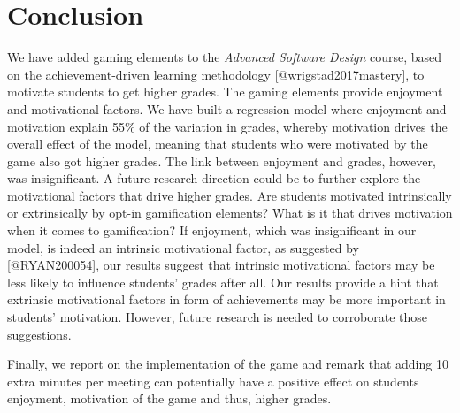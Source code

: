 \documentclass[
]{article}
\begin{document}
\hypertarget{conclusion}{%
\section{Conclusion}\label{conclusion}}

We have added gaming elements to the \textit{Advanced Software Design}
course, based on the achievement-driven learning methodology
{[}@wrigstad2017mastery{]}, to motivate students to get higher grades.
The gaming elements provide enjoyment and motivational factors. We have
built a regression model where enjoyment and motivation explain 55\% of
the variation in grades, whereby motivation drives the overall effect of
the model, meaning that students who were motivated by the game also got
higher grades. The link between enjoyment and grades, however, was
insignificant. A future research direction could be to further explore
the motivational factors that drive higher grades. Are students
motivated intrinsically or extrinsically by opt-in gamification
elements? What is it that drives motivation when it comes to
gamification? If enjoyment, which was insignificant in our model, is
indeed an intrinsic motivational factor, as suggested by
{[}@RYAN200054{]}, our results suggest that intrinsic motivational
factors may be less likely to influence students' grades after all. Our
results provide a hint that extrinsic motivational factors in form of
achievements may be more important in students' motivation. However,
future research is needed to corroborate those suggestions.

Finally, we report on the implementation of the game and remark that
adding 10 extra minutes per meeting can potentially have a positive
effect on students enjoyment, motivation of the game and thus, higher
grades.
\end{document}
